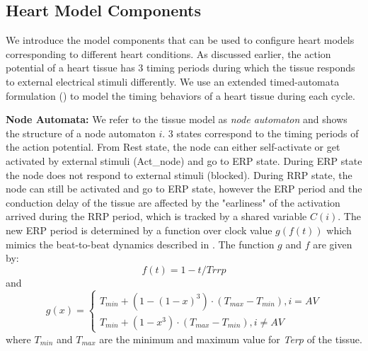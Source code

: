 \subsection{Heart Model Components}
We introduce the model components that can be used to configure heart models corresponding to different heart conditions. As discussed earlier, the action potential of a heart tissue has 3 timing periods during which the tissue responds to external electrical stimuli differently. We use an extended timed-automata formulation (\cite{timed_automata}) to model the timing behaviors of a heart tissue during each cycle. 

\textbf{Node Automata:} We refer to the tissue model as \emph{node automaton} and  shows the structure of a node automaton $i$. 3 states correspond to the timing periods of the action potential. From \textsf{Rest} state, the node can either self-activate or get activated by external stimuli (Act\_node) and go to \textsf{ERP} state. During \textsf{ERP} state the node does not respond to external stimuli (blocked). During \textsf{RRP} state, the node can still be activated and go to \textsf{ERP} state, however the ERP period and the conduction delay of the tissue are affected by the "earliness" of the activation arrived during the RRP period, which is tracked by a shared variable $C(i)$. The new ERP period is determined by a function over clock value $g(f(t))$ which mimics the beat-to-beat dynamics described in \cite{josephson}. The function $g$ and $f$ are given by:
\begin{equation} \label{factor}
						f(t) = 1-t/Trrp
						\end{equation}
and
\begin{equation} \label{earliness_noAV}
						g(x) = \left\{
						\begin{array}{lr}
						
						T_{min}+(1-(1-x)^3)\cdot (T_{max}-T_{min}), i=AV\\
						T_{min}+(1-x^3)\cdot (T_{max}-T_{min}),i\neq AV
			
						
						\end{array}
						\right.
						\end{equation}  
where $T_{min}$ and $T_{max}$ are the minimum and maximum value for \emph{Terp} of the tissue.
